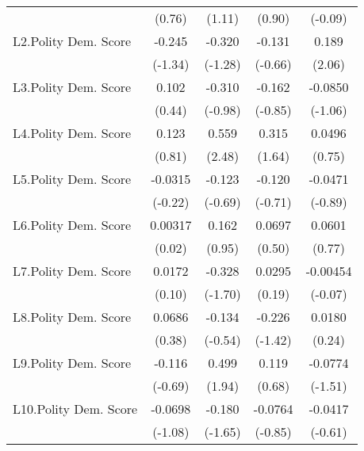 {\begin{longtable}{l*{4}{c}}
                &   (0.76)         &   (1.11)         &   (0.90)         &  (-0.09)         \\
[1em]
L2.Polity Dem. Score&   -0.245         &   -0.320         &   -0.131         &    0.189\sym{*}  \\
                &  (-1.34)         &  (-1.28)         &  (-0.66)         &   (2.06)         \\
[1em]
L3.Polity Dem. Score&    0.102         &   -0.310         &   -0.162         &  -0.0850         \\
                &   (0.44)         &  (-0.98)         &  (-0.85)         &  (-1.06)         \\
[1em]
L4.Polity Dem. Score&    0.123         &    0.559\sym{*}  &    0.315         &   0.0496         \\
                &   (0.81)         &   (2.48)         &   (1.64)         &   (0.75)         \\
[1em]
L5.Polity Dem. Score&  -0.0315         &   -0.123         &   -0.120         &  -0.0471         \\
                &  (-0.22)         &  (-0.69)         &  (-0.71)         &  (-0.89)         \\
[1em]
L6.Polity Dem. Score&  0.00317         &    0.162         &   0.0697         &   0.0601         \\
                &   (0.02)         &   (0.95)         &   (0.50)         &   (0.77)         \\
[1em]
L7.Polity Dem. Score&   0.0172         &   -0.328         &   0.0295         & -0.00454         \\
                &   (0.10)         &  (-1.70)         &   (0.19)         &  (-0.07)         \\
[1em]
L8.Polity Dem. Score&   0.0686         &   -0.134         &   -0.226         &   0.0180         \\
                &   (0.38)         &  (-0.54)         &  (-1.42)         &   (0.24)         \\
[1em]
L9.Polity Dem. Score&   -0.116         &    0.499         &    0.119         &  -0.0774         \\
                &  (-0.69)         &   (1.94)         &   (0.68)         &  (-1.51)         \\
[1em]
L10.Polity Dem. Score&  -0.0698         &   -0.180         &  -0.0764         &  -0.0417         \\
                &  (-1.08)         &  (-1.65)         &  (-0.85)         &  (-0.61)         \\

\end{longtable}}
